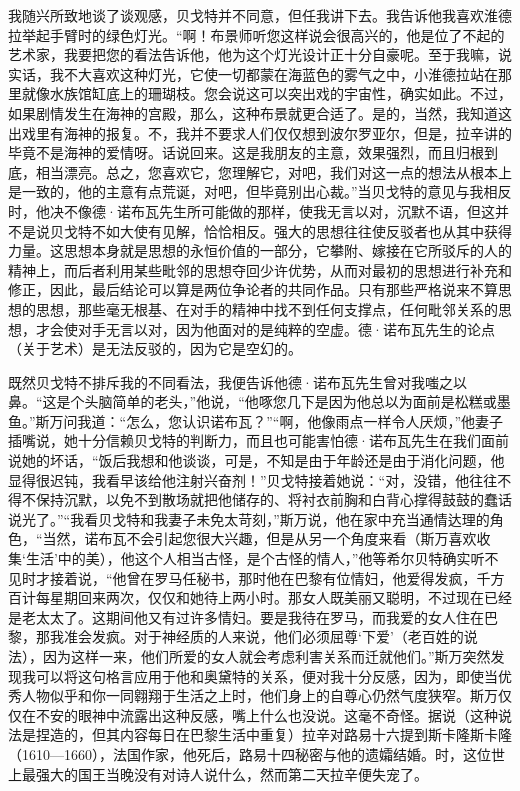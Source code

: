 \par 我随兴所致地谈了谈观感，贝戈特并不同意，但任我讲下去。我告诉他我喜欢淮德拉举起手臂时的绿色灯光。“啊！布景师听您这样说会很高兴的，他是位了不起的艺术家，我要把您的看法告诉他，他为这个灯光设计正十分自豪呢。至于我嘛，说实话，我不大喜欢这种灯光，它使一切都蒙在海蓝色的雾气之中，小淮德拉站在那里就像水族馆缸底上的珊瑚枝。您会说这可以突出戏的宇宙性，确实如此。不过，如果剧情发生在海神的宫殿，那么，这种布景就更合适了。是的，当然，我知道这出戏里有海神的报复。不，我并不要求人们仅仅想到波尔罗亚尔，但是，拉辛讲的毕竟不是海神的爱情呀。话说回来。这是我朋友的主意，效果强烈，而且归根到底，相当漂亮。总之，您喜欢它，您理解它，对吧，我们对这一点的想法从根本上是一致的，他的主意有点荒诞，对吧，但毕竟别出心裁。”当贝戈特的意见与我相反时，他决不像德·诺布瓦先生所可能做的那样，使我无言以对，沉默不语，但这并不是说贝戈特不如大使有见解，恰恰相反。强大的思想往往使反驳者也从其中获得力量。这思想本身就是思想的永恒价值的一部分，它攀附、嫁接在它所驳斥的人的精神上，而后者利用某些毗邻的思想夺回少许优势，从而对最初的思想进行补充和修正，因此，最后结论可以算是两位争论者的共同作品。只有那些严格说来不算思想的思想，那些毫无根基、在对手的精神中找不到任何支撑点，任何毗邻关系的思想，才会使对手无言以对，因为他面对的是纯粹的空虚。德·诺布瓦先生的论点（关于艺术）是无法反驳的，因为它是空幻的。
\par 既然贝戈特不排斥我的不同看法，我便告诉他德·诺布瓦先生曾对我嗤之以鼻。“这是个头脑简单的老头，”他说，“他啄您几下是因为他总以为面前是松糕或墨鱼。”斯万问我道：“怎么，您认识诺布瓦？”“啊，他像雨点一样令人厌烦，”他妻子插嘴说，她十分信赖贝戈特的判断力，而且也可能害怕德·诺布瓦先生在我们面前说她的坏话，“饭后我想和他谈谈，可是，不知是由于年龄还是由于消化问题，他显得很迟钝，我看早该给他注射兴奋剂！”贝戈特接着她说：“对，没错，他往往不得不保持沉默，以免不到散场就把他储存的、将衬衣前胸和白背心撑得鼓鼓的蠢话说光了。”“我看贝戈特和我妻子未免太苛刻，”斯万说，他在家中充当通情达理的角色，“当然，诺布瓦不会引起您很大兴趣，但是从另一个角度来看（斯万喜欢收集‘生活’中的美），他这个人相当古怪，是个古怪的情人，”他等希尔贝特确实听不见时才接着说，“他曾在罗马任秘书，那时他在巴黎有位情妇，他爱得发疯，千方百计每星期回来两次，仅仅和她待上两小时。那女人既美丽又聪明，不过现在已经是老太太了。这期间他又有过许多情妇。要是我待在罗马，而我爱的女人住在巴黎，那我准会发疯。对于神经质的人来说，他们必须屈尊‘下爱’（老百姓的说法），因为这样一来，他们所爱的女人就会考虑利害关系而迁就他们。”斯万突然发现我可以将这句格言应用于他和奥黛特的关系，便对我十分反感，因为，即使当优秀人物似乎和你一同翱翔于生活之上时，他们身上的自尊心仍然气度狭窄。斯万仅仅在不安的眼神中流露出这种反感，嘴上什么也没说。这毫不奇怪。据说（这种说法是捏造的，但其内容每日在巴黎生活中重复）拉辛对路易十六提到斯卡隆斯卡隆（1610—1660），法国作家，他死后，路易十四秘密与他的遗孀结婚。时，这位世上最强大的国王当晚没有对诗人说什么，然而第二天拉辛便失宠了。

